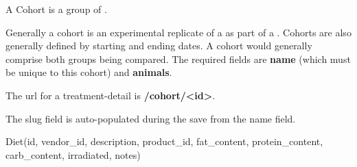 \documentclass[letterpaper,10pt,english]{sphinxmanual}
\begin{document}
\begin{fulllineitems}
\label{data:mousedb.data.models.Cohort}
A Cohort is a group of .

Generally a cohort is an experimental replicate of a {\hyperref[data:mousedb.data.models.Treatment]{}} as part of a {\hyperref[data:mousedb.data.models.Study]{}}.
Cohorts are also generally defined by starting and ending dates.
A cohort would generally comprise both {\hyperref[data:mousedb.data.models.Treatment]{}} groups being compared.
The required fields are \textbf{name} (which must be unique to this cohort) and \textbf{animals}.

\begin{fulllineitems}
\label{data:mousedb.data.models.Cohort.get_absolute_url}
The url for a treatment-detail is \textbf{/cohort/\textless{}id\textgreater{}}.

\end{fulllineitems}


\begin{fulllineitems}
\label{data:mousedb.data.models.Cohort.save}
The slug field is auto-populated during the save from the name field.

\end{fulllineitems}


\end{fulllineitems}


\begin{fulllineitems}
\label{data:mousedb.data.models.Diet}
Diet(id, vendor\_id, description, product\_id, fat\_content, protein\_content, carb\_content, irradiated, notes)

\end{fulllineitems}

\end{document}
